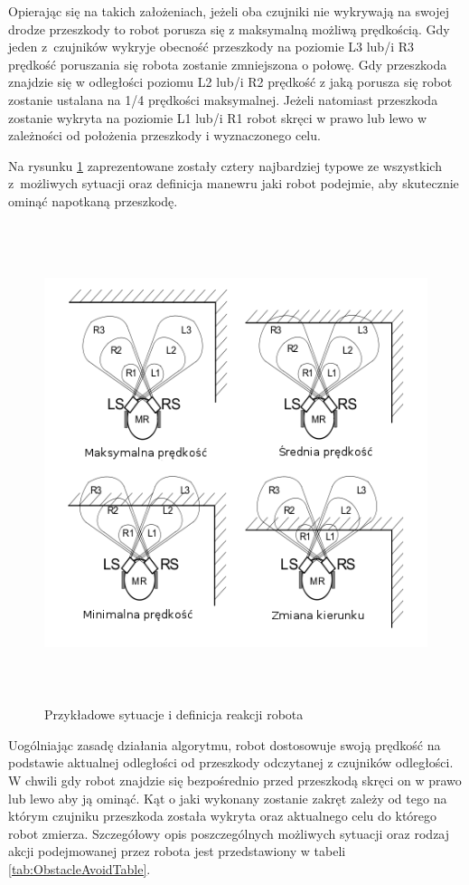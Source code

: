 Opierając się na takich założeniach, jeżeli oba czujniki nie
wykrywają na swojej drodze przeszkody to robot porusza się z maksymalną możliwą
prędkością. Gdy jeden z~czujników wykryje obecność przeszkody na poziomie  L3
lub/i R3 prędkość poruszania się robota zostanie zmniejszona o połowę. Gdy
przeszkoda znajdzie się w odległości poziomu L2 lub/i R2 prędkość z jaką porusza
się robot zostanie ustalana na 1/4 prędkości maksymalnej. Jeżeli natomiast
przeszkoda zostanie wykryta na poziomie L1 lub/i R1 robot skręci w prawo lub lewo
w zależności od położenia przeszkody i wyznaczonego celu.

Na rysunku \ref{fig:IRTestCases} zaprezentowane zostały cztery najbardziej
typowe ze wszystkich z~możliwych sytuacji oraz definicja manewru jaki robot
podejmie, aby skutecznie ominąć napotkaną przeszkodę. 

\begin{figure}[h!]
 \centering
 \includegraphics[height=140mm]{../images/ch04/obs_avoid_algorithm.png}
 \caption{Przykładowe sytuacje i definicja reakcji robota}
 \label{fig:IRTestCases}
\end{figure}

Uogólniając zasadę działania algorytmu, robot dostosowuje swoją prędkość na
podstawie aktualnej odległości od przeszkody odczytanej z czujników odległości.
W chwili gdy robot znajdzie się bezpośrednio przed przeszkodą skręci on w prawo
lub lewo aby ją ominąć. Kąt o jaki wykonany zostanie zakręt zależy od tego na
którym czujniku przeszkoda została wykryta oraz aktualnego celu do którego robot
zmierza. Szczegółowy opis poszczególnych możliwych sytuacji oraz rodzaj akcji
podejmowanej przez robota jest przedstawiony w tabeli
\ref{tab:ObstacleAvoidTable}.

